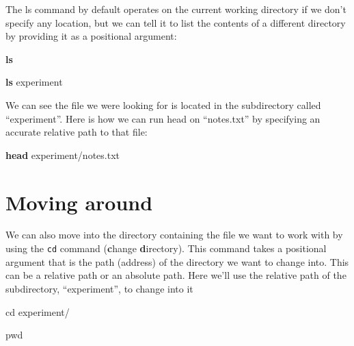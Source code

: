 \documentclass[
]{book}
\newenvironment{Shaded}{\begin{snugshade}}{\end{snugshade}}
\newcommand{\BuiltInTok}[1]{#1}
\newcommand{\FunctionTok}[1]{\textcolor[rgb]{0.13,0.29,0.53}{\textbf{#1}}}
\newcommand{\NormalTok}[1]{#1}
\begin{document}
The ls command by default operates on the current working directory if we don't specify any location, but we can tell it to list the contents of a different directory by providing it as a positional argument:

\begin{Shaded}
\begin{Highlighting}[]
    \FunctionTok{ls}
\end{Highlighting}
\end{Shaded}

\begin{Shaded}
\begin{Highlighting}[]
    \FunctionTok{ls}\NormalTok{ experiment}
\end{Highlighting}
\end{Shaded}

We can see the file we were looking for is located in the subdirectory called ``experiment''. Here is how we can run head on ``notes.txt'' by specifying an accurate relative path to that file:

\begin{Shaded}
\begin{Highlighting}[]
    \FunctionTok{head}\NormalTok{ experiment/notes.txt}
\end{Highlighting}
\end{Shaded}

\hypertarget{moving-around}{%
\section{Moving around}\label{moving-around}}

We can also move into the directory containing the file we want to work with by using the \texttt{cd} command (\textbf{c}hange \textbf{d}irectory). This command takes a positional argument that is the path (address) of the directory we want to change into. This can be a relative path or an absolute path. Here we'll use the relative path of the subdirectory, ``experiment'', to change into it

\begin{Shaded}
\begin{Highlighting}[]
    \BuiltInTok{cd}\NormalTok{ experiment/}
\end{Highlighting}
\end{Shaded}

\begin{Shaded}
\begin{Highlighting}[]
    \BuiltInTok{pwd}
\end{Highlighting}
\end{Shaded}
\end{document}
